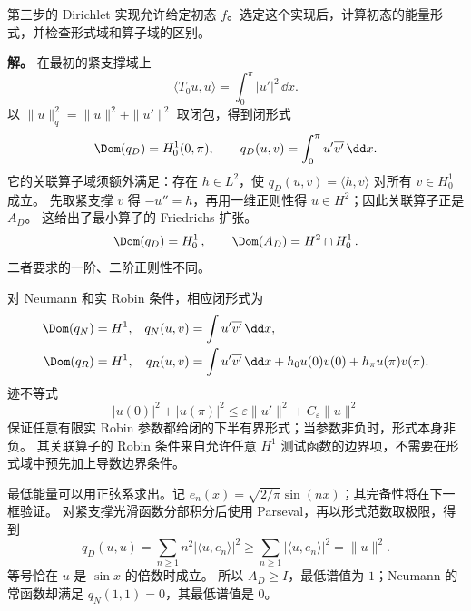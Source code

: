 \begin{exbox}
第三步的 Dirichlet 实现允许给定初态 $f$。选定这个实现后，计算初态的能量形式，并检查形式域和算子域的区别。

\textbf{解。} 在最初的紧支撑域上
\[
 \langle T_0u,u\rangle=\int_0^\pi|u'|^2\,\dd x.
\]
以 $\|u\|_q^2=\|u\|^2+\|u'\|^2$ 取闭包，得到闭形式
\[
 \Dom(q_D)=H_0^1(0,\pi),\qquad
 q_D(u,v)=\int_0^\pi u'\overline{v'}\,\dd x.
\]
它的关联算子域须额外满足：存在 $h\in L^2$，使 $q_D(u,v)=\langle h,v\rangle$ 对所有 $v\in H_0^1$ 成立。
先取紧支撑 $v$ 得 $-u''=h$，再用一维正则性得 $u\in H^2$；因此关联算子正是 $A_D$。
这给出了最小算子的 Friedrichs 扩张。
\[
 {\Dom(q_D)=H_0^1\,,\qquad
 \Dom(A_D)=H^2\cap H_0^1\,.}
\]
二者要求的一阶、二阶正则性不同。

对 Neumann 和实 Robin 条件，相应闭形式为
\begin{align*}
 \Dom(q_N)&=H^1,&q_N(u,v)&=\int u'\overline{v'}\,\dd x,\\
 \Dom(q_R)&=H^1,&q_R(u,v)&=\int u'\overline{v'}\,\dd x
 +h_0u(0)\overline{v(0)}+h_\pi u(\pi)\overline{v(\pi)}.
\end{align*}
迹不等式
\[
 |u(0)|^2+|u(\pi)|^2\le\varepsilon\|u'\|^2+C_\varepsilon\|u\|^2
\]
保证任意有限实 Robin 参数都给闭的下半有界形式；当参数非负时，形式本身非负。
其关联算子的 Robin 条件来自允许任意 $H^1$ 测试函数的边界项，不需要在形式域中预先加上导数边界条件。

最低能量可以用正弦系求出。记 $e_n(x)=\sqrt{2/\pi}\sin(nx)$；其完备性将在下一框验证。
对紧支撑光滑函数分部积分后使用 Parseval，再以形式范数取极限，得到
\[
 q_D(u,u)=\sum_{n\ge1}n^2|\langle u,e_n\rangle|^2
 \ge\sum_{n\ge1}|\langle u,e_n\rangle|^2=\|u\|^2.
\]
等号恰在 $u$ 是 $\sin x$ 的倍数时成立。
所以 $A_D\ge I$，最低谱值为 $1$；Neumann 的常函数却满足 $q_N(1,1)=0$，其最低谱值是 $0$。
\end{exbox}

